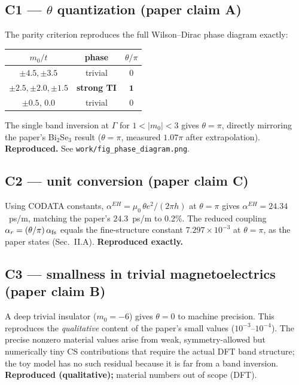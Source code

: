 \documentclass[11pt]{article}
\begin{document}
\subsection*{C1 --- $\theta$ quantization (paper claim A)}
The parity criterion reproduces the full Wilson--Dirac phase diagram
exactly:
\begin{center}\begin{tabular}{ccc}
\toprule
$m_0/t$ & phase & $\theta/\pi$ \\ \midrule
$\pm4.5,\pm3.5$ & trivial & $0$ \\
$\pm2.5,\pm2.0,\pm1.5$ & \textbf{strong TI} & $\mathbf{1}$ \\
$\pm0.5,\,0.0$ & trivial & $0$ \\
\bottomrule
\end{tabular}\end{center}
The single band inversion at $\Gamma$ for $1<|m_0|<3$ gives $\theta=\pi$,
directly mirroring the paper's Bi$_2$Se$_3$ result ($\theta=\pi$, measured
$1.07\pi$ after extrapolation). \textbf{Reproduced.}
See \texttt{work/fig\_phase\_diagram.png}.

\subsection*{C2 --- unit conversion (paper claim C)}
Using CODATA constants,
$\alpha^{EH}=\mu_0\,\theta e^2/(2\pi h)$ at $\theta=\pi$ gives
$\alpha^{EH}=\mathbf{24.34}$~ps/m, matching the paper's $24.3$~ps/m to
0.2\%. The reduced coupling $\alpha_r=(\theta/\pi)\,\alpha_{\rm fs}$ equals
the fine-structure constant $7.297\times10^{-3}$ at $\theta=\pi$, as the
paper states (Sec.~II.A). \textbf{Reproduced exactly.}

\subsection*{C3 --- smallness in trivial magnetoelectrics (paper claim B)}
A deep trivial insulator ($m_0=-6$) gives $\theta=0$ to machine precision.
This reproduces the \emph{qualitative} content of the paper's small values
($10^{-3}$--$10^{-4}$). The precise nonzero material values arise from
weak, symmetry-allowed but numerically tiny CS contributions that require
the actual DFT band structure; the toy model has no such residual because
it is far from a band inversion. \textbf{Reproduced (qualitative);}
material numbers out of scope (DFT).
\end{document}
